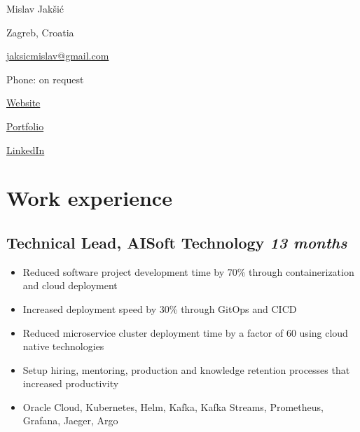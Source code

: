 \documentclass[a4paper]{article}
\newcommand{\bolditalicpair}
[2]
{\textbf{#1} \texorpdfstring{\hfill}{} \textit{#2}}
\begin{document}
\begin{multicols}{3}

\noindent
\begin{minipage}{.22\textwidth}
\raggedright

{\huge Mislav Jakšić}

Zagreb, Croatia
\end{minipage}

\noindent
\begin{minipage}{.50\textwidth}
\raggedleft

\href{mailto:jaksicmislav@gmail.com}{jaksicmislav@gmail.com}

Phone: on request

\end{minipage}

\noindent
\begin{minipage}{.32\textwidth}
\raggedleft

\href{https://mislav-jaksic.from.hr/}{Website}

\href{https://github.com/MislavJaksic}{Portfolio}

\href{https://www.linkedin.com/in/mislav-jaksic}{LinkedIn}

\end{minipage}

\end{multicols}



\section{Work experience}
\subsection{\bolditalicpair{Technical Lead, AISoft Technology}{13 months}}

\begin{itemize}
  \item Reduced software project development time by 70\% through containerization and cloud deployment
  \item Increased deployment speed by 30\% through GitOps and CICD
  \item Reduced microservice cluster deployment time by a factor of 60 using cloud native technologies
  \item Setup hiring, mentoring, production and knowledge retention processes that increased productivity
  \item Oracle Cloud, Kubernetes, Helm, Kafka, Kafka Streams, Prometheus, Grafana, Jaeger, Argo
\end{itemize}
\end{document}
